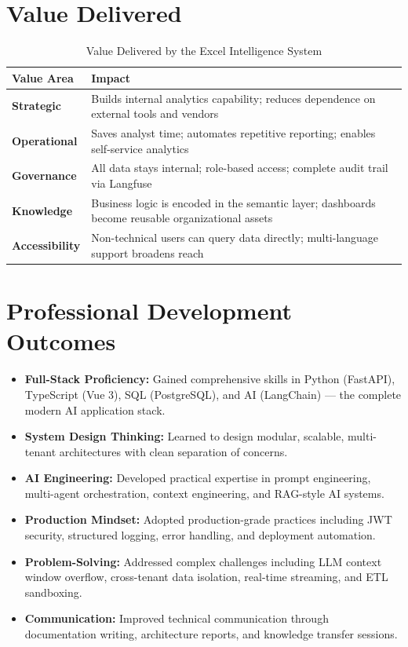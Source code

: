 \documentclass[12pt,a4paper]{report}
\begin{document}
\section{Value Delivered}

\begin{table}[H]
\centering
\caption{Value Delivered by the Excel Intelligence System}
\begin{tabular}{>{\bfseries}p{3.5cm} p{9cm}}
\toprule
\textbf{Value Area} & \textbf{Impact} \\
\midrule
Strategic & Builds internal analytics capability; reduces dependence on external tools and vendors \\
Operational & Saves analyst time; automates repetitive reporting; enables self-service analytics \\
Governance & All data stays internal; role-based access; complete audit trail via Langfuse \\
Knowledge & Business logic is encoded in the semantic layer; dashboards become reusable organizational assets \\
Accessibility & Non-technical users can query data directly; multi-language support broadens reach \\
\bottomrule
\end{tabular}
\label{tab:value}
\end{table}

\section{Professional Development Outcomes}

\begin{itemize}[leftmargin=1.5cm]
    \item \textbf{Full-Stack Proficiency:} Gained comprehensive skills in Python (FastAPI), TypeScript (Vue 3), SQL (PostgreSQL), and AI (LangChain) --- the complete modern AI application stack.
    \item \textbf{System Design Thinking:} Learned to design modular, scalable, multi-tenant architectures with clean separation of concerns.
    \item \textbf{AI Engineering:} Developed practical expertise in prompt engineering, multi-agent orchestration, context engineering, and RAG-style AI systems.
    \item \textbf{Production Mindset:} Adopted production-grade practices including JWT security, structured logging, error handling, and deployment automation.
    \item \textbf{Problem-Solving:} Addressed complex challenges including LLM context window overflow, cross-tenant data isolation, real-time streaming, and ETL sandboxing.
    \item \textbf{Communication:} Improved technical communication through documentation writing, architecture reports, and knowledge transfer sessions.
\end{itemize}
\end{document}
